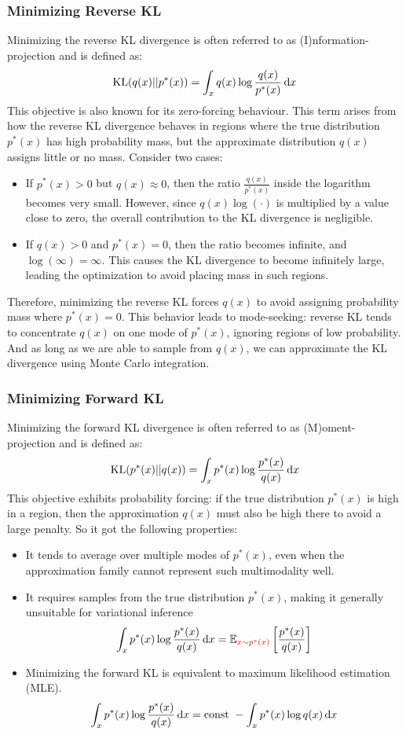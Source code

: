 \subsubsection{Minimizing Reverse KL}
Minimizing the reverse KL divergence is often referred to as (I)nformation-projection and is defined as:
$$\text{KL}(q(x)||p^*(x)) = \int_x q(x)\log{\frac{q(x)}{p^*(x)}} \mathop{}\!\mathrm{d} x$$
This objective is also known for its zero-forcing behaviour. This term arises from how the reverse KL divergence 
behaves in regions where the true distribution $p^*(x)$ has high probability mass, but the approximate distribution 
$q(x)$ assigns little or no mass. Consider two cases:
\begin{itemize}
    \item If $p^*(x) > 0$ but $q(x) \approx 0$, then the ratio $\frac{q(x)}{p^*(x)}$ inside the logarithm becomes 
    very small. However, since $q(x) \log(\cdot)$ is multiplied by a value close to zero, the overall contribution to 
    the KL divergence is negligible.    
    \item If $q(x) > 0$ and $p^*(x) = 0$, then the ratio becomes infinite, and $\log(\infty) = \infty$. This causes 
    the 
    KL divergence to become infinitely large, leading the optimization to avoid placing mass in such regions.
\end{itemize}
Therefore, minimizing the reverse KL forces $q(x)$ to avoid assigning probability mass where $p^*(x) = 0$. This 
behavior leads to mode-seeking: reverse KL tends to concentrate $q(x)$ on one mode of $p^*(x)$, ignoring regions of 
low probability. And as long as we are able to sample from $q(x)$, we can approximate the KL divergence using Monte 
Carlo integration.

\subsubsection{Minimizing Forward KL}
Minimizing the forward KL divergence is often referred to as (M)oment-projection and is defined as:
$$\text{KL}(p^*(x)||q(x)) = \int_x p^*(x)\log{\frac{p^*(x)}{q(x)}} \mathop{}\!\mathrm{d} x$$
This objective exhibits probability forcing: if the true distribution $p^*(x)$ is high in a region, 
then the approximation $q(x)$ must also be high there to avoid a large penalty. So it got the following properties:
\begin{itemize}
    \item It tends to average over multiple modes of $p^*(x)$, even when the approximation family cannot represent 
    such multimodality well.
    \item It requires samples from the true distribution $p^*(x)$, making it generally unsuitable for variational 
    inference 
    $$ \int_x p^*(x)\log{\frac{p^*(x)}{q(x)}} \mathop{}\!\mathrm{d} x = \mathbb{E}_{\color{red}x \sim p^*(x)}\left[\frac{p^*(x)}{q(x)}\right]$$
    \item Minimizing the forward KL is equivalent to maximum likelihood estimation (MLE).
    $$ \int_x p^*(x)\log{\frac{p^*(x)}{q(x)}} \mathop{}\!\mathrm{d} x = \text{const }- \int_x p^*(x)\log{q(x)} \mathop{}\!\mathrm{d} x$$
\end{itemize}


